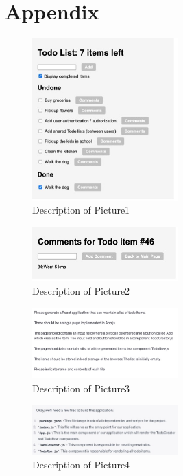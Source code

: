 \documentclass[runningheads]{llncs}
\begin{document}
\section*{Appendix}
\begin{figure}[h]
    \centering
    \includegraphics[width=0.5\textwidth]{Pictures/Picture1.jpg}
    \caption{Description of Picture1}
    \label{fig:picture1}
\end{figure}
\begin{figure}[h]
    \centering
    \includegraphics[width=0.5\textwidth]{Pictures/Picture2.jpg}
    \caption{Description of Picture2}
    \label{fig:picture2}
\end{figure}
\begin{figure}[h]
    \centering
    \includegraphics[width=0.5\textwidth]{Pictures/Picture3.jpg}
    \caption{Description of Picture3}
    \label{fig:picture3}
\end{figure}
\begin{figure}[h]
    \centering
    \includegraphics[width=0.5\textwidth]{Pictures/Picture4.jpg}
    \caption{Description of Picture4}
    \label{fig:picture4}
\end{figure}
\end{document}
